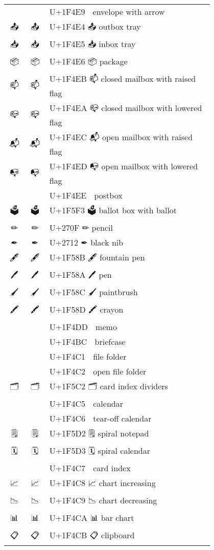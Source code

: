 \documentclass[a4paper,12pt]{ltjarticle}
\newcommand{\fontA}[1]{{\fontspec[RawFeature={mode=harf,+dist,+ccmp}]{Segoe UI Emoji} #1}}
\newcommand{\fontB}[1]{{\fontspec[RawFeature={mode=harf,+dist,+ccmp}]{Noto Color Emoji} #1}}
\begin{document}
\begin{longtable}[c]{ccp{0.8\linewidth}}
\fontA{📩}&\fontB{📩}&U+1F4E9 📩 envelope with arrow\\
\fontA{📤}&\fontB{📤}&U+1F4E4 📤 outbox tray\\
\fontA{📥}&\fontB{📥}&U+1F4E5 📥 inbox tray\\
\fontA{📦}&\fontB{📦}&U+1F4E6 📦 package\\
\fontA{📫}&\fontB{📫}&U+1F4EB 📫 closed mailbox with raised flag\\
\fontA{📪}&\fontB{📪}&U+1F4EA 📪 closed mailbox with lowered flag\\
\fontA{📬}&\fontB{📬}&U+1F4EC 📬 open mailbox with raised flag\\
\fontA{📭}&\fontB{📭}&U+1F4ED 📭 open mailbox with lowered flag\\
\fontA{📮}&\fontB{📮}&U+1F4EE 📮 postbox\\
\fontA{🗳}&\fontB{🗳}&U+1F5F3 🗳 ballot box with ballot\\
\fontA{✏}&\fontB{✏}&U+270F ✏ pencil\\
\fontA{✒}&\fontB{✒}&U+2712 ✒ black nib\\
\fontA{🖋}&\fontB{🖋}&U+1F58B 🖋 fountain pen\\
\fontA{🖊}&\fontB{🖊}&U+1F58A 🖊 pen\\
\fontA{🖌}&\fontB{🖌}&U+1F58C 🖌 paintbrush\\
\fontA{🖍}&\fontB{🖍}&U+1F58D 🖍 crayon\\
\fontA{📝}&\fontB{📝}&U+1F4DD 📝 memo\\
\fontA{💼}&\fontB{💼}&U+1F4BC 💼 briefcase\\
\fontA{📁}&\fontB{📁}&U+1F4C1 📁 file folder\\
\fontA{📂}&\fontB{📂}&U+1F4C2 📂 open file folder\\
\fontA{🗂}&\fontB{🗂}&U+1F5C2 🗂 card index dividers\\
\fontA{📅}&\fontB{📅}&U+1F4C5 📅 calendar\\
\fontA{📆}&\fontB{📆}&U+1F4C6 📆 tear-off calendar\\
\fontA{🗒}&\fontB{🗒}&U+1F5D2 🗒 spiral notepad\\
\fontA{🗓}&\fontB{🗓}&U+1F5D3 🗓 spiral calendar\\
\fontA{📇}&\fontB{📇}&U+1F4C7 📇 card index\\
\fontA{📈}&\fontB{📈}&U+1F4C8 📈 chart increasing\\
\fontA{📉}&\fontB{📉}&U+1F4C9 📉 chart decreasing\\
\fontA{📊}&\fontB{📊}&U+1F4CA 📊 bar chart\\
\fontA{📋}&\fontB{📋}&U+1F4CB 📋 clipboard\\

\end{longtable}
\end{document}
